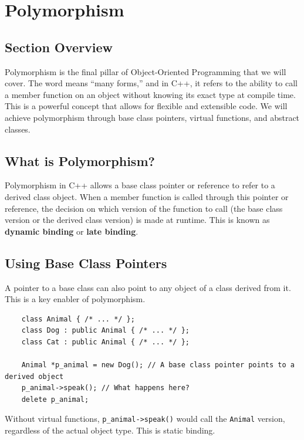 \section{Polymorphism}

\subsection{Section Overview}
Polymorphism is the final pillar of Object-Oriented Programming that we will cover. The word means ``many forms,'' and in C++, it refers to the ability to call a member function on an object without knowing its exact type at compile time. This is a powerful concept that allows for flexible and extensible code. We will achieve polymorphism through base class pointers, virtual functions, and abstract classes.

\subsection{What is Polymorphism?}
Polymorphism in C++ allows a base class pointer or reference to refer to a derived class object. When a member function is called through this pointer or reference, the decision on which version of the function to call (the base class version or the derived class version) is made at runtime. This is known as \textbf{dynamic binding} or \textbf{late binding}.

\subsection{Using Base Class Pointers}
A pointer to a base class can also point to any object of a class derived from it. This is a key enabler of polymorphism.
\begin{lstlisting}
	class Animal { /* ... */ };
	class Dog : public Animal { /* ... */ };
	class Cat : public Animal { /* ... */ };

	Animal *p_animal = new Dog(); // A base class pointer points to a derived object
	p_animal->speak(); // What happens here?
	delete p_animal;
\end{lstlisting}
Without virtual functions, \texttt{p\_animal->speak()} would call the \texttt{Animal} version, regardless of the actual object type. This is static binding.

